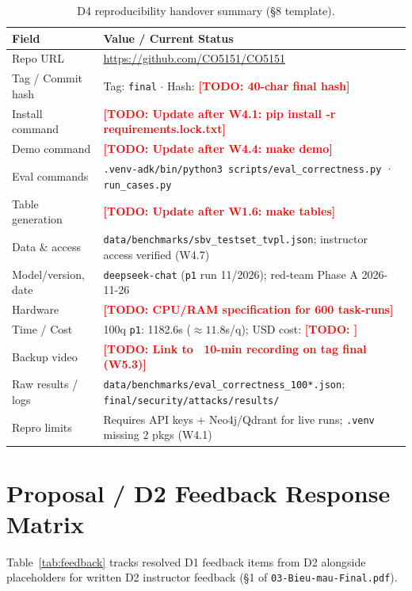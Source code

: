 \documentclass[sigconf,nonacm]{acmart}
\newcommand{\TODO}[1]{\textcolor{red}{\textbf{[TODO: #1]}}}
\begin{document}
\begin{table}[H]
\caption{D4 reproducibility handover summary (§8 template).}
\label{tab:d4}
\scriptsize
\begin{tabular}{@{}p{2.3cm}p{5.6cm}@{}}
\toprule
\textbf{Field} & \textbf{Value / Current Status} \\
\midrule
Repo URL & \url{https://github.com/CO5151/CO5151} \\
Tag / Commit hash & Tag: \texttt{final} $\cdot$ Hash: \TODO{40-char final hash} \\
Install command & \TODO{Update after W4.1: pip install -r requirements.lock.txt} \\
Demo command & \TODO{Update after W4.4: make demo} \\
Eval commands & \texttt{.venv-adk/bin/python3 scripts/eval\_correctness.py} · \texttt{run\_cases.py} \\
Table generation & \TODO{Update after W1.6: make tables} \\
Data \& access & \texttt{data/benchmarks/sbv\_testset\_tvpl.json}; instructor access verified (W4.7) \\
Model/version, date & \texttt{deepseek-chat} (\texttt{p1} run 11/2026); red-team Phase A 2026-11-26 \\
Hardware & \TODO{CPU/RAM specification for 600 task-runs} \\
Time / Cost & 100q \texttt{p1}: 1182.6s ($\approx 11.8$s/q); USD cost: \TODO{} \\
Backup video & \TODO{Link to ~10-min recording on tag final (W5.3)} \\
Raw results / logs & \texttt{data/benchmarks/eval\_correctness\_100*.json}; \texttt{final/security/attacks/results/} \\
Repro limits & Requires API keys + Neo4j/Qdrant for live runs; \texttt{.venv} missing 2 pkgs (W4.1) \\
\bottomrule
\end{tabular}
\end{table}

\section{Proposal / D2 Feedback Response Matrix}
\label{app:response}

Table~\ref{tab:feedback} tracks resolved D1 feedback items from D2 alongside placeholders for written D2 instructor feedback (§1 of \texttt{03-Bieu-mau-Final.pdf}).
\end{document}
